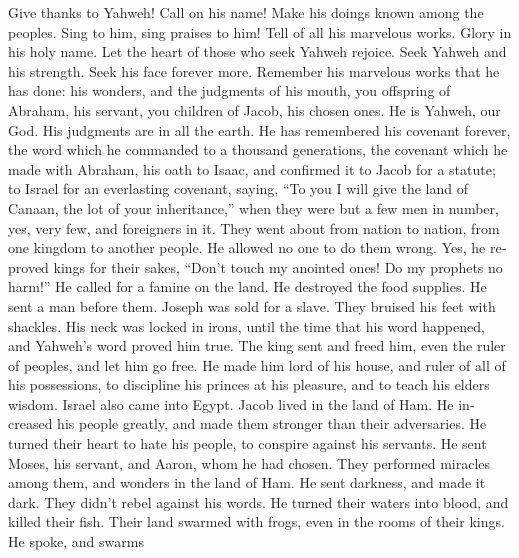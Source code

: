 \begin{paracol}{2}
\begin{otherlanguage}{english}
 Give thanks to Yahweh! Call on his name! Make his doings
known among the peoples.  Sing to him, sing praises to
him! Tell of all his marvelous works.  Glory in his holy
name. Let the heart of those who seek Yahweh rejoice. 
Seek Yahweh and his strength. Seek his face forever more. 
Remember his marvelous works that he has done: his wonders, and the
judgments of his mouth,  you offspring of Abraham, his
servant, you children of Jacob, his chosen ones.  He is
Yahweh, our God. His judgments are in all the earth.  He
has remembered his covenant forever, the word which he commanded to a
thousand generations,  the covenant which he made with
Abraham, his oath to Isaac,  and confirmed it to Jacob
for a statute; to Israel for an everlasting covenant, 
saying, ``To you I will give the land of Canaan, the lot of your
inheritance,''  when they were but a few men in number,
yes, very few, and foreigners in it.  They went about
from nation to nation, from one kingdom to another people.
 He allowed no one to do them wrong. Yes, he reproved
kings for their sakes,  ``Don't touch my anointed ones!
Do my prophets no harm!''  He called for a famine on the
land. He destroyed the food supplies.  He sent a man
before them. Joseph was sold for a slave.  They bruised
his feet with shackles. His neck was locked in irons, 
until the time that his word happened, and Yahweh's word proved him
true.  The king sent and freed him, even the ruler of
peoples, and let him go free.  He made him lord of his
house, and ruler of all of his possessions,  to
discipline his princes at his pleasure, and to teach his elders wisdom.
 Israel also came into Egypt. Jacob lived in the land of
Ham.  He increased his people greatly, and made them
stronger than their adversaries.  He turned their heart
to hate his people, to conspire against his servants.  He
sent Moses, his servant, and Aaron, whom he had chosen. 
They performed miracles among them, and wonders in the land of Ham.
 He sent darkness, and made it dark. They didn't rebel
against his words.  He turned their waters into blood,
and killed their fish.  Their land swarmed with frogs,
even in the rooms of their kings.  He spoke, and swarms

\end{otherlanguage}
\end{paracol}

